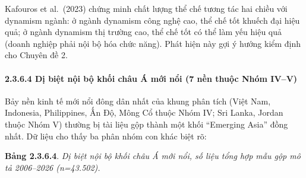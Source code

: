 \documentclass[
  a4paper,
  13pt]{extreport}
\begin{document}
Kafouros et al.~(2023) chứng minh chất lượng thể chế tương tác hai chiều
với dynamism ngành: ở ngành dynamism công nghệ cao, thể chế tốt khuếch
đại hiệu quả; ở ngành dynamism thị trường cao, thể chế tốt có thể làm
yếu hiệu quả (doanh nghiệp phải nội bộ hóa chức năng). Phát hiện này gợi
ý hướng kiểm định cho Chuyên đề 2.

\hypertarget{dux1ecb-biux1ec7t-nux1ed9i-bux1ed9-khux1ed1i-chuxe2u-uxe1-mux1edbi-nux1ed5i-7-nux1ec1n-thuux1ed9c-nhuxf3m-ivv}{%
\paragraph{2.3.6.4 Dị biệt nội bộ khối châu Á mới nổi (7 nền thuộc Nhóm
IV--V)}\label{dux1ecb-biux1ec7t-nux1ed9i-bux1ed9-khux1ed1i-chuxe2u-uxe1-mux1edbi-nux1ed5i-7-nux1ec1n-thuux1ed9c-nhuxf3m-ivv}}

Bảy nền kinh tế mới nổi đông dân nhất của khung phân tích (Việt Nam,
Indonesia, Philippines, Ấn Độ, Mông Cổ thuộc Nhóm IV; Sri Lanka, Jordan
thuộc Nhóm V) thường bị tài liệu gộp thành một khối ``Emerging Asia''
đồng nhất. Dữ liệu cho thấy ba phân nhóm con khác biệt rõ:

\textbf{Bảng 2.3.6.4}. \emph{Dị biệt nội bộ khối châu Á mới nổi, số liệu
tổng hợp mẫu gộp mô tả 2006--2026 (n=43.502).}
\end{document}
